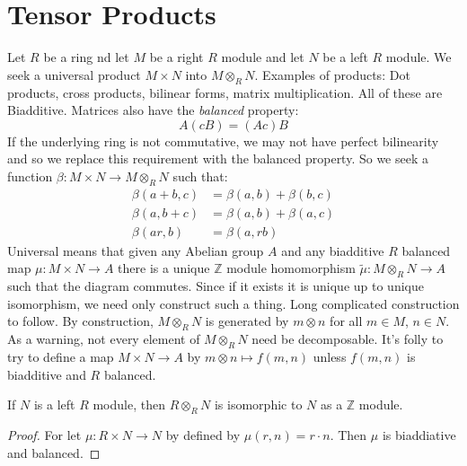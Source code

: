 \documentclass{article}                                                        %
\begin{document}
    \section{Tensor Products}
        Let $R$ be a ring nd let $M$ be a right $R$ module and let $N$ be a
        left $R$ module. We seek a universal product $M\times{N}$ into
        $M\otimes_{R}N$. Examples of products: Dot products, cross products,
        bilinear forms, matrix multiplication. All of these are Biadditive.
        Matrices also have the \textit{balanced} property:
        \begin{equation}
            A(cB)=(Ac)B
        \end{equation}
        If the underlying ring is not commutative, we may not have perfect
        bilinearity and so we replace this requirement with the balanced
        property. So we seek a function
        $\beta:M\times{N}\rightarrow{M}\otimes_{R}N$ such that:
        \begin{align}
            \beta(a+b,c)&=\beta(a,b)+\beta(b,c)\tag{Left Additivity}\\
            \beta(a,b+c)&=\beta(a,b)+\beta(a,c)\tag{Right Additivity}\\
            \beta(ar,b)&=\beta(a,rb)\tag{Balanced}
        \end{align}
        Universal means that given any Abelian group $A$ and any biadditive
        $R$ balanced map $\mu:M\times{N}\rightarrow{A}$ there is a unique
        $\mathbb{Z}$ module homomorphism
        $\tilde{\mu}:M\otimes_{R}N\rightarrow{A}$ such that the diagram
        commutes. Since if it exists it is unique up to unique isomorphism, we
        need only construct such a thing. Long complicated construction to
        follow. By construction, $M\otimes_{R}N$ is generated by $m\otimes{n}$
        for all $m\in{M}$, $n\in{N}$. As a warning, not every element of
        $M\otimes_{R}N$ need be decomposable. It's folly to try to define a map
        $M\times{N}\rightarrow{A}$ by $m\otimes{n}\mapsto{f}(m,n)$ unless
        $f(m,n)$ is biadditive and $R$ balanced.
        \begin{theorem}
            If $N$ is a left $R$ module, then $R\otimes_{R}N$ is isomorphic to
            $N$ as a $\mathbb{Z}$ module.
        \end{theorem}
        \begin{proof}
            For let $\mu:R\times{N}\rightarrow{N}$ by defined by
            $\mu(r,n)=r\cdot{n}$. Then $\mu$ is biaddiative and balanced.
        \end{proof}
\end{document}
